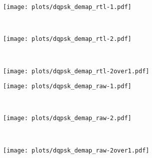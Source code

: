 \documentclass[class=report,11pt,crop=false]{standalone}
\begin{document}
\begin{figure}[htbp]
  \centering
  \captionsetup{type=figure}
  \begin{subfigure}[t]{0.3\textwidth}
    \centering
    \captionsetup{type=figure}
    \texttt{[image: plots/dqpsk\_demap\_rtl-1.pdf]}
    \caption{}
    \label{fig:dqpsk_demap_rtl-1}
  \end{subfigure}%
  ~ 
  \begin{subfigure}[t]{0.3\textwidth}
    \centering
    \captionsetup{type=figure}
    \texttt{[image: plots/dqpsk\_demap\_rtl-2.pdf]}
    \caption{}
    \label{fig:dqpsk_demap_rtl-2}
  \end{subfigure}
  ~ 
  \begin{subfigure}[t]{0.3\textwidth}
    \centering
    \captionsetup{type=figure}
    \texttt{[image: plots/dqpsk\_demap\_rtl-2over1.pdf]}
    \caption{}
    \label{fig:dqpsk_demap_rtl-2over1}
  \end{subfigure}
  \caption{}
  \label{fig:dqpsk_demap_rtl}
\end{figure}


\begin{figure}[htbp]
  \centering
  \captionsetup{type=figure}
  \begin{subfigure}[t]{0.3\textwidth}
    \centering
    \captionsetup{type=figure}
    \texttt{[image: plots/dqpsk\_demap\_raw-1.pdf]}
    \caption{}
    \label{fig:dqpsk_demap_rtl-1}
  \end{subfigure}%
  ~ 
  \begin{subfigure}[t]{0.3\textwidth}
    \centering
    \captionsetup{type=figure}
    \texttt{[image: plots/dqpsk\_demap\_raw-2.pdf]}
    \caption{}
    \label{fig:dqpsk_demap_rtl-2}
  \end{subfigure}
  ~ 
  \begin{subfigure}[t]{0.3\textwidth}
    \centering
    \captionsetup{type=figure}
    \texttt{[image: plots/dqpsk\_demap\_raw-2over1.pdf]}
    \caption{}
    \label{fig:dqpsk_demap_raw-2over1}
  \end{subfigure}
  \caption{}
  \label{fig:dqpsk_demap_raw}
\end{figure}

\begin{figure}[htbp]
  \centering
  \captionsetup{type=figure}
  \def\svgwidth{\linewidth}
  { %
      }
  \caption{}
  \label{fig:dqpsk_demap}
\end{figure}
\end{document}
